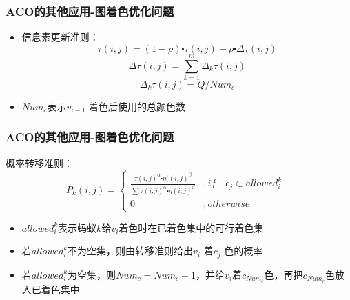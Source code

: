 \begin{frame}
	\frametitle{ACO的其他应用-图着色优化问题}
	\begin{itemize}
		\item {信息素更新准则：
		$$
		\tau (i,j)= (1-\rho)\centerdot \tau(i,j)+\rho \centerdot \Delta \tau(i,j)
		$$
		$$
		\Delta \tau(i,j) = \sum_{k=1}^{m}\Delta_k \tau(i,j)
		$$
		$$
		\Delta_k \tau(i,j) = Q/Num_c
		$$}
		\item {$Num_c$表示$v_{i-1}$ 着色后使用的总颜色数}
	\end{itemize}
\end{frame}


\begin{frame}
	\frametitle{ACO的其他应用-图着色优化问题}
	概率转移准则：
	\Large{
	$$
	P_k(i,j) =
		\begin{cases}
		\frac{\tau (i,j)^\alpha \centerdot \eta ((i,j)^\beta}{\sum \tau (i,j)^\alpha \centerdot \eta (i,j)^\beta}  & \text{$,if\quad c_j \subset allowed_i^k$ } \\
		0 & \text{$,otherwise$}
		\end{cases}
	$$}
	\normalsize{
	\begin{itemize}
		\item {$allowed_i^k$表示蚂蚁$k$给$v_i$着色时在已着色集中的可行着色集}
		\item {若$allowed_i^k$不为空集，则由转移准则给出$v_i$ 着$c_j$ 色的概率}
		\item {若$allowed_i^k$为空集，则$Num_c= Num_c+1$，并给$v_i$着$c_{Num_c}$色，再把$c_{Num_c}$色放入已着色集中}
	\end{itemize}
	}
\end{frame}